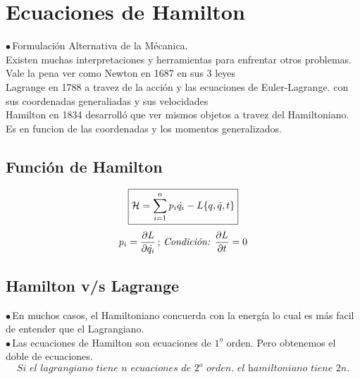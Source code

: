 \documentclass[12pt]{article}
\newcommand{\eq}[1]{\[#1\]}
\newcommand{\s}[1]{\section{#1}}
\newcommand{\en}[1]{\[\boxed{#1}\]}
\renewcommand{\ss}[1]{\subsection{#1}}
\newcommand{\pua}{$\bullet \, $}
\begin{document}
\s{Ecuaciones de Hamilton}
\pua Formulación Alternativa de la Mécanica.\\
Existen muchas interpretaciones y herramientas para enfrentar otros problemas.\\ Vale la pena ver como Newton en 1687 en sus 3 leyes\\
 Lagrange en 1788 a travez de la acción y las ecuaciones de Euler-Lagrange. con sus coordenadas generaliadas y sus velocidades\\
 Hamilton en 1834 desarrolló que ver mismos objetos a travez del Hamiltoniano. Es en funcion de las coordenadas y los momentos generalizados.\\
\ss{Función de Hamilton}

\en{\mathcal{H} = \sum_{i=1}^{n} p_i \dot{q_i} - L\qty{q,\dot{q},t}} 
\eq{p_i = \pdv{L}{\dot{q_i}} \, ; \, \textit{Condición: } \pdv{L}{t}=0} 

\ss{Hamilton v/s Lagrange}

\pua En muchos casos, el Hamiltoniano concuerda con la energía lo cual es más facil de entender que el Lagrangiano.\\

\pua Las ecuaciones de Hamilton son ecuaciones de $1^o$ orden. Pero obtenemos el doble de ecuaciones.\\
\en{\textit{Si el lagrangiano tiene n ecuaciones de $2^o$ orden. el hamiltoniano tiene 2n.}}
\end{document}
